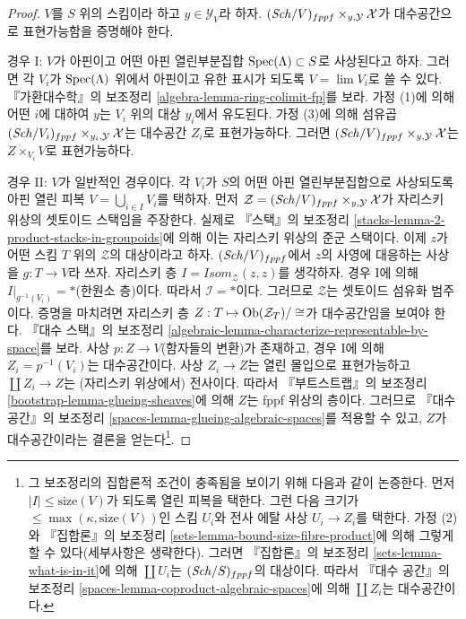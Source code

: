 \begin{proof}
$V$를 $S$ 위의 스킴이라 하고 $y \in \mathcal{Y}_V$라 하자.
$(\mathit{Sch}/V)_{fppf} \times_{y, \mathcal{Y}} \mathcal{X}$가
대수공간으로 표현가능함을 증명해야 한다.

\medskip\noindent
경우 I: $V$가 아핀이고 어떤 아핀 열린부분집합
$\mathop{\mathrm{Spec}}(\Lambda) \subset S$로 사상된다고 하자.
그러면 각 $V_i$가 $\mathop{\mathrm{Spec}}(\Lambda)$ 위에서 아핀이고 유한 표시가 되도록
$V = \lim V_i$로 쓸 수 있다. 『가환대수학』의 보조정리
\ref{algebra-lemma-ring-colimit-fp}를 보라.
가정 (1)에 의해 어떤 $i$에 대하여 $y$는 $V_i$ 위의 대상
$y_i$에서 유도된다. 가정 (3)에 의해 섬유곱
$(\mathit{Sch}/V_i)_{fppf} \times_{y_i, \mathcal{Y}} \mathcal{X}$는
대수공간 $Z_i$로 표현가능하다. 그러면
$(\mathit{Sch}/V)_{fppf} \times_{y, \mathcal{Y}} \mathcal{X}$는
$Z \times_{V_i} V$로 표현가능하다.

\medskip\noindent
경우 II: $V$가 일반적인 경우이다. 각 $V_i$가 $S$의 어떤 아핀
열린부분집합으로 사상되도록 아핀 열린 피복
$V = \bigcup_{i \in I} V_i$를 택하자. 먼저
$\mathcal{Z} = (\mathit{Sch}/V)_{fppf} \times_{y, \mathcal{Y}} \mathcal{X}$가
자리스키 위상의 셋토이드 스택임을 주장한다. 실제로
『스택』의 보조정리
\ref{stacks-lemma-2-product-stacks-in-groupoids}에 의해
이는 자리스키 위상의 준군 스택이다.
이제 $z$가 어떤 스킴 $T$ 위의 $\mathcal{Z}$의 대상이라고 하자.
$(\mathit{Sch}/V)_{fppf}$에서 $z$의 사영에 대응하는 사상을
$g : T \to V$라 쓰자. 자리스키 층
$\mathit{I} = \mathit{Isom}_{\mathcal{Z}}(z, z)$를 생각하자.
경우 I에 의해 $\mathit{I}|_{g^{-1}(V_i)} = *$(한원소 층)이다.
따라서 $\mathcal{I} = *$이다. 그러므로 $\mathcal{Z}$는
셋토이드 섬유화 범주이다. 증명을 마치려면 자리스키 층
$Z : T \mapsto \mathop{\mathrm{Ob}}\nolimits(\mathcal{Z}_T)/\cong$가 대수공간임을 보여야 한다.
『대수 스택』의 보조정리
\ref{algebraic-lemma-characterize-representable-by-space}를 보라.
사상 $p : Z \to V$(함자들의 변환)가 존재하고, 경우 I에 의해
$Z_i = p^{-1}(V_i)$는 대수공간이다. 사상 $Z_i \to Z$는
열린 몰입으로 표현가능하고 $\coprod Z_i \to Z$는
(자리스키 위상에서) 전사이다. 따라서 『부트스트랩』의 보조정리
\ref{bootstrap-lemma-glueing-sheaves}에 의해 $Z$는 fppf 위상의 층이다.
그러므로 『대수 공간』의 보조정리
\ref{spaces-lemma-glueing-algebraic-spaces}를 적용할 수 있고,
$Z$가 대수공간이라는 결론을 얻는다\footnote{
그 보조정리의 집합론적 조건이 충족됨을 보이기 위해 다음과 같이 논증한다.
먼저 $|I| \leq \text{size}(V)$가 되도록 열린 피복을 택한다.
그런 다음 크기가 $\leq \max(\kappa, \text{size}(V))$인 스킴 $U_i$와
전사 에탈 사상 $U_i \to Z_i$를 택한다. 가정 (2)와
『집합론』의 보조정리 \ref{sets-lemma-bound-size-fibre-product}에 의해
그렇게 할 수 있다(세부사항은 생략한다). 그러면 『집합론』의 보조정리
\ref{sets-lemma-what-is-in-it}에 의해 $\coprod U_i$는
$(\mathit{Sch}/S)_{fppf}$의 대상이다. 따라서 『대수 공간』의 보조정리
\ref{spaces-lemma-coproduct-algebraic-spaces}에 의해
$\coprod Z_i$는 대수공간이다.
}.
\end{proof}


